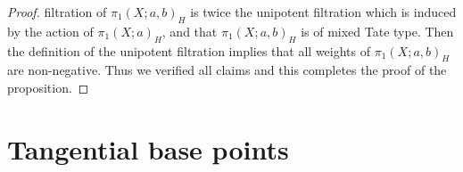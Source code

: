 \begin{proof}
                                                                                                                                                                                                                                                                                                                                                                                                                                                                                                                                                                                                                                                                                                                                                                                                                                                                                                                                                                                                                              
                                                                                                                                                                                                                                                                                                                                                                                                                                                                                                                                                                                                                                                                                                                                                                                                                                                                                                                                                                                                                              
                                                          filtration of $\pi_1(X;a,b)_H$ is twice the unipotent filtration which is induced by the action of $\pi_1(X;a)_H$, and that $\pi_1(X;a,b)_H$ is of mixed Tate type. Then the definition of the unipotent filtration implies that all weights of $\pi_1(X;a,b)_H$ are non-negative. Thus we verified all claims and this completes the proof of the proposition.
\end{proof}

\section{Tangential base points}\label{sec:tangentialpoints}

